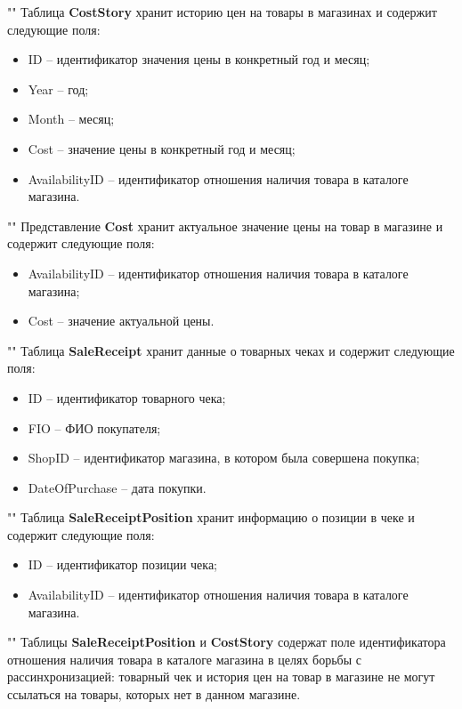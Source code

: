 \documentclass[a4paper,14pt]{extreport}
\begin{document}
""\newline\indent
Таблица \textbf{CostStory} хранит историю цен на товары в магазинах и содержит следующие поля:
\begin{itemize}
	\setlength\itemsep{0.01em}
	\item ID -- идентификатор значения цены в конкретный год и месяц;
	\item Year -- год;
	\item Month -- месяц;
	\item Cost -- значение цены в конкретный год и месяц;
	\item AvailabilityID -- идентификатор отношения наличия товара в каталоге магазина.
\end{itemize}

""\newline\indent
Представление \textbf{Cost} хранит актуальное значение цены на товар в магазине и содержит следующие поля:
\begin{itemize}
	\setlength\itemsep{0.01em}
	\item AvailabilityID -- идентификатор отношения наличия товара в каталоге магазина;
	\item Cost -- значение актуальной цены.
\end{itemize}

""\newline\indent
Таблица \textbf{SaleReceipt} хранит данные о товарных чеках и содержит следующие поля:
\begin{itemize}
	\setlength\itemsep{0.01em}
	\item ID -- идентификатор товарного чека;
	\item FIO -- ФИО покупателя;
	\item ShopID -- идентификатор магазина, в котором была совершена покупка;
	\item DateOfPurchase -- дата покупки.
\end{itemize}

""\newline\indent
Таблица \textbf{SaleReceiptPosition} хранит информацию о позиции в чеке и содержит следующие поля:
\begin{itemize}
	\setlength\itemsep{0.01em}
	\item ID -- идентификатор позиции чека;
	\item AvailabilityID -- идентификатор отношения наличия товара в каталоге магазина.
\end{itemize}

""\newline\indent
Таблицы \textbf{SaleReceiptPosition} и \textbf{CostStory} содержат поле идентификатора отношения наличия товара в каталоге магазина в целях борьбы с рассинхронизацией: товарный чек и история цен на товар в магазине не могут ссылаться на товары, которых нет в данном магазине.
\end{document}
